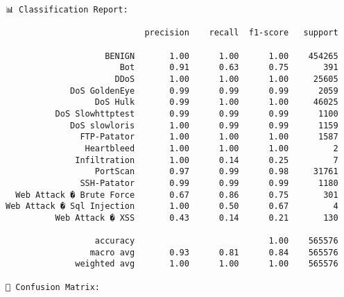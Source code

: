\documentclass[11pt]{article}
\begin{document}
    \begin{Verbatim}[commandchars=\\\{\}]
📊 Classification Report:

                            precision    recall  f1-score   support

                    BENIGN       1.00      1.00      1.00    454265
                       Bot       0.91      0.63      0.75       391
                      DDoS       1.00      1.00      1.00     25605
             DoS GoldenEye       0.99      0.99      0.99      2059
                  DoS Hulk       0.99      1.00      1.00     46025
          DoS Slowhttptest       0.99      0.99      0.99      1100
             DoS slowloris       1.00      0.99      0.99      1159
               FTP-Patator       1.00      1.00      1.00      1587
                Heartbleed       1.00      1.00      1.00         2
              Infiltration       1.00      0.14      0.25         7
                  PortScan       0.97      0.99      0.98     31761
               SSH-Patator       0.99      0.99      0.99      1180
  Web Attack � Brute Force       0.67      0.86      0.75       301
Web Attack � Sql Injection       1.00      0.50      0.67         4
          Web Attack � XSS       0.43      0.14      0.21       130

                  accuracy                           1.00    565576
                 macro avg       0.93      0.81      0.84    565576
              weighted avg       1.00      1.00      1.00    565576

🧾 Confusion Matrix:


\end{Verbatim}
\end{document}
